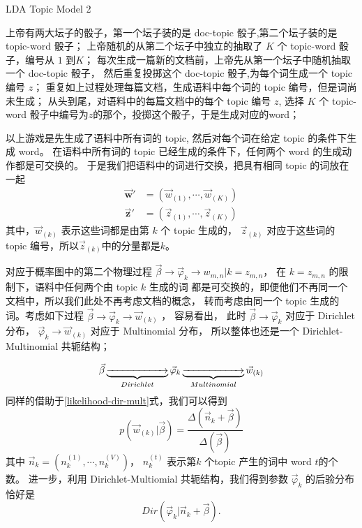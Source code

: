 \begin{algorithm}[H]
\caption{LDA Topic Model 2}
\begin{algorithmic}[1]
\STATE 上帝有两大坛子的骰子，第一个坛子装的是 doc-topic 骰子,第二个坛子装的是 topic-word 骰子；
\STATE 上帝随机的从第二个坛子中独立的抽取了 $K$ 个 topic-word 骰子，编号从 $1$ 到$K$；
\STATE 每次生成一篇新的文档前，上帝先从第一个坛子中随机抽取一个 doc-topic 骰子，
然后重复投掷这个 doc-topic 骰子,为每个词生成一个 topic 编号 $z$；
重复如上过程处理每篇文档，生成语料中每个词的 topic 编号，但是词尚未生成；
\STATE 从头到尾，对语料中的每篇文档中的每个 topic 编号 $z$, 选择 $K$ 个 topic-word 骰子中编号为$z$的那个，投掷这个骰子，于是生成对应的word；
\end{algorithmic}
\end{algorithm}

以上游戏是先生成了语料中所有词的 topic, 然后对每个词在给定 topic 的条件下生成 word。
在语料中所有词的 topic 已经生成的条件下，任何两个 word 的生成动作都是可交换的。
于是我们把语料中的词进行交换，把具有相同 topic 的词放在一起
\begin{align*}
\vec{\mathbf{w}}' &= (\vec{w}_{(1)}, \cdots, \vec{w}_{(K)}) \\
\vec{\mathbf{z}}' &= (\vec{z}_{(1)}, \cdots, \vec{z}_{(K)})
\end{align*}
其中，$\vec{w}_{(k)}$ 表示这些词都是由第 $k$ 个 topic 生成的，
$\vec{z}_{(k)}$ 对应于这些词的 topic 编号，所以$\vec{z}_{(k)}$中的分量都是$k$。

对应于概率图中的第二个物理过程
$\vec{\beta} \rightarrow \vec{\varphi}_k \rightarrow w_{m,n} | k=z_{m,n}$，
在 $k=z_{m,n}$ 的限制下，语料中任何两个由 topic $k$ 生成的词
都是可交换的，即便他们不再同一个文档中，所以我们此处不再考虑文档的概念，
转而考虑由同一个 topic 生成的词。考虑如下过程
$\vec{\beta} \rightarrow \vec{\varphi}_k \rightarrow \vec{w}_{(k)}$ ，
容易看出， 此时 $\vec{\beta} \rightarrow \vec{\varphi}_k $ 对应于 Dirichlet 分布，
$ \vec{\varphi}_k \rightarrow \vec{w}_{(k)}$ 对应于 Multinomial 分布， 所以整体也还是一个
Dirichlet-Multinomial 共轭结构；

$$ \vec{\beta}\underbrace{\xrightarrow{\hspace*{2cm}}}_{Dirichlet} \vec{\varphi}_k
\underbrace{\xrightarrow{\hspace*{2cm}}}_{Multinomial} \vec{w}_{(k)} $$
同样的借助于\eqref{likelihood-dir-mult}式，我们可以得到
$$ p(\vec{w}_{(k)} |\vec{\beta}) = \frac{\Delta(\vec{n}_k+\vec{\beta})}{\Delta(\vec{\beta})} $$
其中 $\vec{n}_k = (n_{k}^{(1)}, \cdots, n_{k}^{(V)})$，
$n_{k}^{(t)}$ 表示第$k$ 个topic 产生的词中 word $t$的个数。
进一步，利用 Dirichlet-Multiomial 共轭结构，我们得到参数 $ \vec{\varphi}_k$ 的后验分布恰好是
$$Dir( \vec{\varphi}_k| \vec{n}_k + \vec{\beta}).$$


